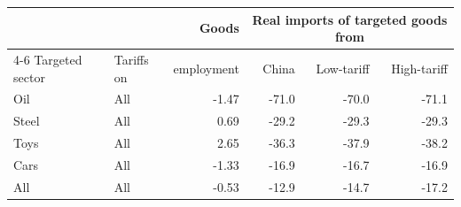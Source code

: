 \begin{tabular}{llrrrr}
\toprule
 & & Goods & \multicolumn{3}{c}{Real imports of targeted goods from} \\
\cmidrule(lr){4-6}
Targeted sector & Tariffs on & employment & China & Low-tariff & High-tariff \\
\midrule
Oil & All & -1.47 & -71.0 & -70.0 & -71.1 \\
\midrule
Steel & All & 0.69 & -29.2 & -29.3 & -29.3 \\
\midrule
Toys & All & 2.65 & -36.3 & -37.9 & -38.2 \\
\midrule
Cars & All & -1.33 & -16.9 & -16.7 & -16.9 \\
\midrule
All & All & -0.53 & -12.9 & -14.7 & -17.2 \\
\bottomrule
\end{tabular}
